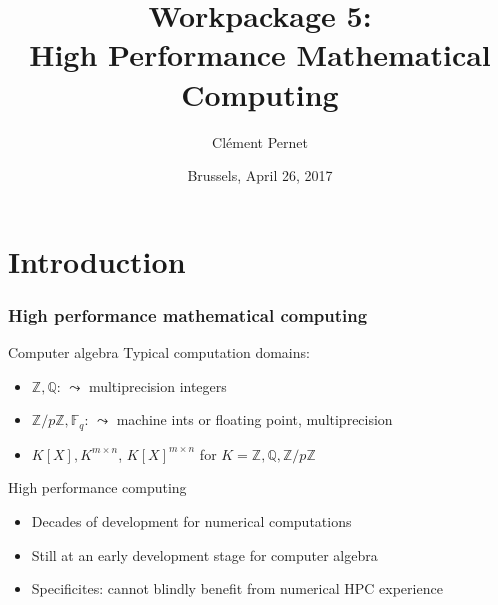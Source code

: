 \documentclass{beamer}
\title[Workpackage 5]{Workpackage 5:\\ High Performance Mathematical Computing}
\author{Clément Pernet}
\institute[ODK Project review]{First OpenDreamKit Project review}
\date{Brussels, April 26, 2017}
\begin{document}
\maketitle

\section*{Introduction}
\begin{frame}
  \frametitle{High performance mathematical computing}

  \begin{block}{Computer algebra}
    Typical computation domains:
    \begin{itemize}
    \item $\mathbb{Z}, \mathbb{Q}$: $\leadsto$ multiprecision integers
    \item $\mathbb{Z}/p\mathbb{Z}, \mathbb{F}_q$: $\leadsto$ machine ints or
      floating point, multiprecision
    \item $K[X], K^{m\times n}$, $K[X]^{m\times n}$ for $K=\mathbb{Z},\mathbb{Q},\mathbb{Z}/p\mathbb{Z}$
    \end{itemize}
  \end{block}

  \begin{block} {High performance computing}
    \begin{itemize}
    \item Decades of development for numerical computations
    \item Still at an early development stage for computer algebra
    \item Specificites: cannot blindly benefit from numerical HPC experience
    \end{itemize}
  \end{block}
\end{frame}
\end{document}
